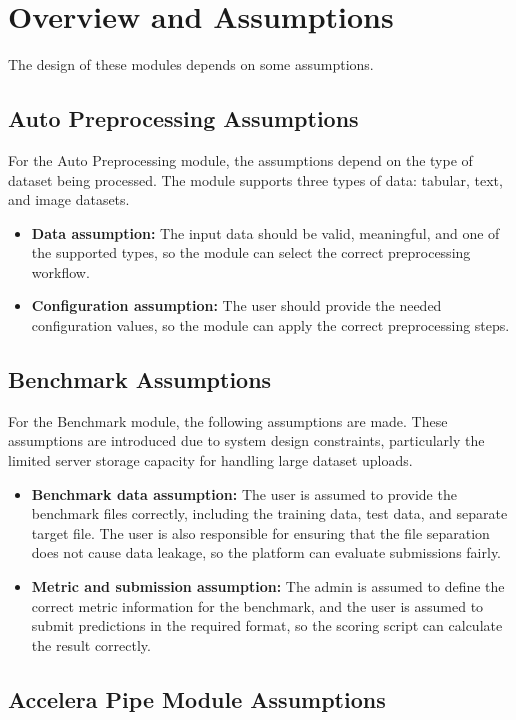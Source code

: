 \documentclass[12pt,a4paper,oneside]{report}
\begin{document}
\section{Overview and Assumptions}
The design of these modules depends on some assumptions.
\subsection{Auto Preprocessing Assumptions}

For the Auto Preprocessing module, the assumptions depend on the type of dataset being processed. The module supports three types of data: tabular, text, and image datasets.
\begin{itemize}
  \item \textbf{Data assumption:} The input data should be valid, meaningful,
  and one of the supported types, so the module can select the correct
  preprocessing workflow.

  \item \textbf{Configuration assumption:} The user should provide the needed
  configuration values, so the module can apply the correct preprocessing steps.
\end{itemize}
\subsection{Benchmark Assumptions}

For the Benchmark module, the following assumptions are made. These assumptions are introduced due to system design constraints, particularly the limited server storage capacity for handling large dataset uploads.

\begin{itemize}
 \item \textbf{Benchmark data assumption:} The user is assumed to provide the
benchmark files correctly, including the training data, test data, and separate
target file. The user is also responsible for ensuring that the file separation
does not cause data leakage, so the platform can evaluate submissions fairly.
  \item \textbf{Metric and submission assumption:} The admin is assumed to define
  the correct metric information for the benchmark, and the user is assumed to
  submit predictions in the required format, so the scoring script can calculate
  the result correctly.
\end{itemize}
\subsection{Accelera Pipe Module Assumptions}
 
\end{document}
